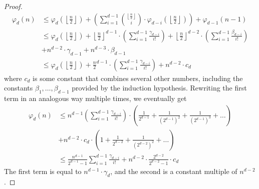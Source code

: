 \documentclass[10pt,a4paper]{amsart}
\begin{document}
\begin{proof}
    \begin{align*}
        \varphi_d(n) &\leq \varphi_d \left( \left\lfloor \frac{n}{2} \right\rfloor \right)
            + \left(\sum_{i=1}^{d-1}\binom{ \left\lfloor \frac{n}{2} \right\rfloor  }{i} \cdot \varphi_{d-i}\left( \left\lfloor\frac{n}{2} \right\rfloor  \right)\right) +\varphi_{d-1}(n-1)\\
            &\leq \varphi_d \left( \left\lfloor \frac{n}{2} \right\rfloor  \right)
            + \left\lfloor \frac{n}{2} \right\rfloor ^{d-1} \cdot \left(\sum_{i=1}^{d-1} \frac{\gamma_{d-i}}{i!}\right)
            + \left\lfloor \frac{n}{2} \right\rfloor ^{d-2} \cdot \left(\sum_{i=1}^{d-1} \frac{\beta_{d-i}}{i!}\right) \\
            &+ n^{d-2}\cdot \gamma_{d-1} + n^{d-3}\cdot \beta_{d-1}\\
            &\leq \varphi_d \left( \left\lfloor \frac{n}{2} \right\rfloor \right)
            + {\frac{n}{2}}^{d-1} \cdot \left(\sum_{i=1}^{d-1} \frac{\gamma_{d-i}}{i!}\right) + n^{d-2}\cdot c_d
    \end{align*}
where $c_d$ is some constant that combines several other numbers, including the constants $\beta_1,\dots,\beta_{d-1}$ provided by the induction hypothesis.
    Rewriting the first term in an analogous way multiple times, we eventually get
    \begin{align*}
        \varphi_d(n) &\leq n^{d-1} \left(\sum_{i=1}^{d-1} \frac{\gamma_{d-i}}{i!}\right)\cdot \left(\frac{1}{2^{d-1}}+ \frac{1}{(2^{d-1})^2}+\frac{1}{(2^{d-1})^3}+\dots\right) \\
        &+ n^{d-2}\cdot c_d \cdot \left(1+\frac{1}{2^{d-2}}+ \frac{1}{(2^{d-2})^2}+\dots\right)\\
        &\leq \frac{n^{d-1}}{2^{d-1}-1} \sum_{i=1}^{d-1} \frac{\gamma_{d-i}}{i!}
        + n^{d-2}\cdot \frac{2^{d-2}}{2^{d-2}-1}\cdot c_d
    \end{align*}
The first term is equal to $n^{d-1}\cdot \gamma_d$, and the second is a constant multiple of $n^{d-2}$.
\end{proof}
\end{document}
